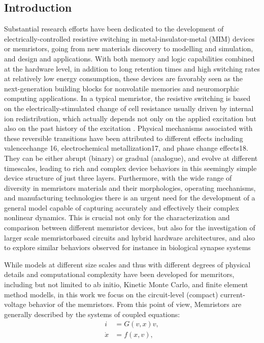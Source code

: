 \documentclass{article}
\begin{document}
{\begin{multicols}{2}
{\section{Introduction}
}
Substantial research efforts have been dedicated to the
development of electrically-controlled resistive switching in metal-insulator-metal (MIM) devices or memristors, going from new materials discovery
to modelling and simulation, and design and applications.
With both memory and logic capabilities combined at
the hardware level, in addition to long retention times
and high switching rates at relatively low energy
consumption, these devices are favorably seen as the
next-generation building blocks for nonvolatile memories and neuromorphic computing applications. In
a typical memristor, the resistive switching is based on
the electrically-stimulated change of cell resistance usually driven by internal ion redistribution, which actually depends not only on the applied excitation but also
on the past history of the excitation
. Physical mechanisms associated with these reversible transitions have
been attributed to different effects including valencechange 16, electrochemical metallization17, and phase
change effects18. They can be either abrupt (binary)
or gradual (analogue), and evolve at different timescales,
leading to rich and complex device behaviors in this seemingly simple device structure of just three layers. Furthermore, with the wide range of diversity in memristors
materials and their morphologies, operating mechanisms,
and manufacturing technologies there is an urgent need
for the development of a general model capable of capturing accurately and effectively their complex nonlinear
dynamics. This is crucial not only for the characterization and comparison between different memristor devices,
but also for the investigation of larger scale memristorbased circuits and hybrid hardware architectures, and
also to explore similar behaviors observed for instance in
biological synapse systems
\par
While models at different size scales and thus with different degrees of physical details and computational complexity have been developed for memritors, including but not limited to ab initio, Kinetic Monte Carlo, and finite element method modells, in this work we focus on the circuit-level (compact) current-voltage behavior of the memristors. From this point of view, Memristors are generally described by the systems of coupled equations: 
\begin{align}{}
     i &= G(v,x)v, \\
     \dot{x} &= f(x,v),
\end{align}


\end{multicols}}
\end{document}
